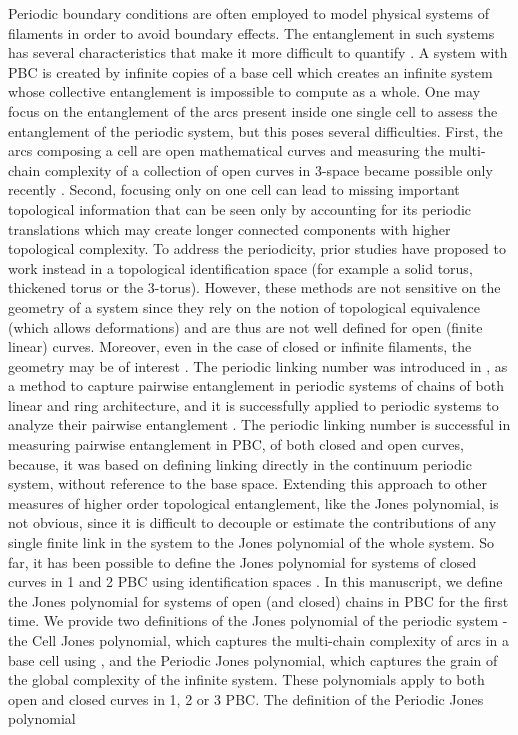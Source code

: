 \documentclass{article}
\begin{document}
Periodic boundary conditions are often employed to model physical systems of filaments in order to avoid boundary effects. The entanglement in such systems has several characteristics that make it more difficult to quantify \cite{Morton2009, Qin2011, Fukuda2023, Fukuda2022,Kolbe2022, Panagiotou2015, Castle2011, Delgado2017, Evans2013b, Evans2015a, Evans2013a, Evans2015b, Markande2020, Knittel2020, Wadekar2020, Wadekar2021, OKeeffe2021, OKeeffe2022, rosi2005rod}. A system with PBC is created by infinite copies of a base
cell which creates an infinite system whose collective entanglement is impossible to compute as a whole.  One may focus on the entanglement of the arcs present inside one single cell to assess the entanglement of the periodic system, but this poses several difficulties. First, the arcs composing a cell are open mathematical curves and measuring the multi-chain complexity of a collection of open curves in 3-space became possible only recently \cite{Barkataki2022}. Second, focusing only on one cell can lead to missing important topological information that can be seen only by accounting for its periodic translations which may create longer connected components with higher topological complexity. To address the periodicity, prior studies have proposed to work instead in a topological identification space (for example a solid torus, thickened torus or the 3-torus). However, these methods are not sensitive on the geometry of a system since they rely on the notion of topological equivalence (which allows deformations) and are thus are not well defined for open (finite linear) curves. Moreover,  even in the case of closed or infinite filaments, the geometry may be of interest \cite{Wadekar2020,Wadekar2021}. The periodic linking number was introduced in \cite{Panagiotou2015}, as a method to capture pairwise entanglement in periodic systems of chains of both linear and ring architecture, and it is successfully applied to periodic systems to analyze their pairwise entanglement \cite{Panagiotou2014,Panagiotou2011,P2018,Millett2016,Panagiotou2013,Panagiotou2019,Igram2016}. The periodic linking number is successful in measuring pairwise entanglement in PBC, of both closed and open curves, because, it was based on defining linking directly in the continuum periodic system, without reference to the base space. Extending this approach to other measures of higher order topological entanglement, like the Jones polynomial, is not obvious, since it is difficult to decouple or estimate the contributions of any single finite link in the system to the Jones polynomial of the whole system. So far, it has been possible to define the Jones polynomial for systems of closed curves in 1 and 2 PBC using identification spaces \cite{Qin2011,Morton2009}. In this manuscript, we define the Jones polynomial for systems of open (and closed) chains in PBC for the first time. We provide two definitions of the Jones polynomial of the periodic system - the Cell Jones polynomial, which captures the multi-chain complexity of arcs in a base cell using \cite{Barkataki2022}, and the Periodic Jones polynomial, which captures the grain of the global complexity of the infinite system. These polynomials apply to both open and closed curves in 1, 2 or 3 PBC. The definition of the Periodic Jones polynomial 
\end{document}
